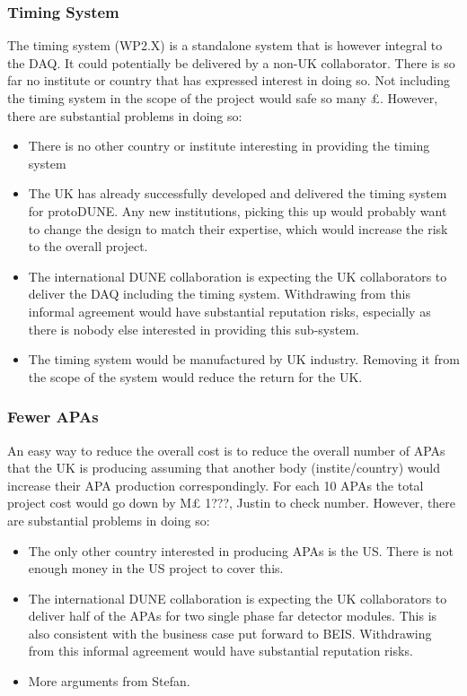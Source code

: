 \subsubsection{Timing System}
The timing system (WP2.X) is a standalone system that is however integral to the DAQ. It could potentially be delivered by a non-UK collaborator. There is so far no institute or country that has expressed interest in doing so. Not including the timing system in the scope of the project would safe {\color{red} so many £}.
However, there are substantial problems in doing so:
\begin{itemize}
    \item There is no other country or institute interesting in providing the timing system
    \item The UK has already successfully developed and delivered the timing system for protoDUNE. Any new institutions, picking this up would probably want to change the design to match their expertise, which would increase the risk to the overall project.
    \item The international DUNE collaboration is expecting the UK collaborators to deliver the DAQ including the timing system. Withdrawing from this informal agreement would have substantial reputation risks, especially as there is nobody else interested in providing this sub-system.
    \item The timing system would be manufactured by UK industry. Removing it from the scope of the system would reduce the return for the UK.
\end{itemize}

\subsubsection{Fewer APAs}
An easy way to reduce the overall cost is to reduce the overall number of APAs that the UK is producing assuming that another body (instite/country) would increase their APA production correspondingly. For each 10 APAs the total project cost would go down by {\color{red} M£ 1???, Justin to check number}. 
However, there are substantial problems in doing so:
\begin{itemize}
    \item The only other country interested in producing APAs is the US. There is not enough money in the US project to cover this.
    \item The international DUNE collaboration is expecting the UK collaborators to deliver half of the APAs for two single phase far detector modules. This is also consistent with the business case put forward to BEIS. Withdrawing from this informal agreement would have substantial reputation risks.
    \item \color{red} More arguments from Stefan.
\end{itemize}

